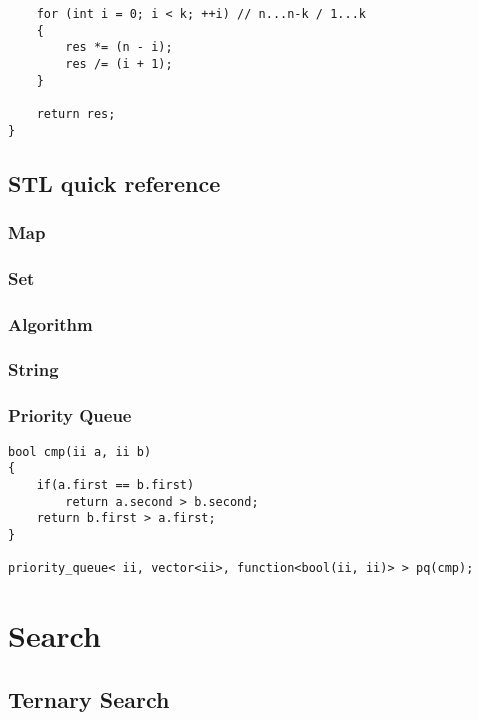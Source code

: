 \documentclass[10pt,oneside]{article}
\begin{document}
\begin{landscape}
\begin{multicols}{2}
\begin{lstlisting}
    for (int i = 0; i < k; ++i) // n...n-k / 1...k
    {
        res *= (n - i);
        res /= (i + 1);
    }
 
    return res;
}
\end{lstlisting}

\subsection{STL quick reference}

\subsubsection{Map}


\subsubsection{Set}


\subsubsection{Algorithm}


\subsubsection{String}

\subsubsection{Priority Queue}

\begin{lstlisting}
bool cmp(ii a, ii b)
{
    if(a.first == b.first)
		return a.second > b.second;
    return b.first > a.first;
}

priority_queue< ii, vector<ii>, function<bool(ii, ii)> > pq(cmp);
\end{lstlisting}


\section{Search}

\subsection{Ternary Search}


\end{multicols}
\end{landscape}
\end{document}
